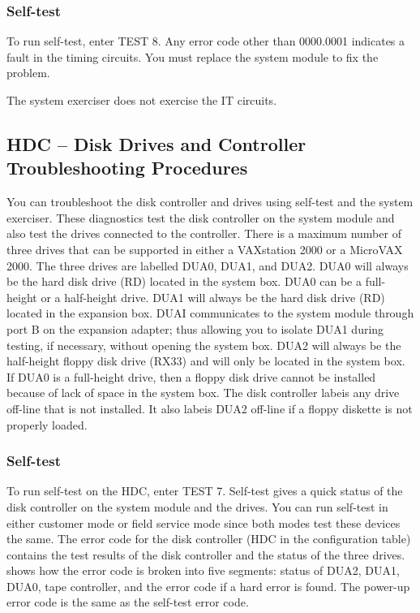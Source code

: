 \subsubsection{Self-test}

To run self-test, enter TEST 8. Any error code other than 0000.0001 indicates
a fault in the timing circuits. You must replace the system module to fix the
problem.

The system exerciser does not exercise the IT circuits.

\subsection{HDC -- Disk Drives and Controller Troubleshooting Procedures}


You can troubleshoot the disk controller and drives using self-test and the
system exerciser. These diagnostics test the disk controller on the system
module and also test the drives connected to the controller. There is a maximum 
number of three drives that can be supported in either a VAXstation
2000 or a MicroVAX 2000. The three drives are labelled DUA0, DUA1, and
DUA2. DUA0 will always be the hard disk drive (RD) located in the system
box. DUA0 can be a full-height or a half-height drive. DUA1 will always be
the hard disk drive (RD) located in the expansion box. DUAI communicates
to the system module through port B on the expansion adapter; thus allowing 
you to isolate DUA1 during testing, if necessary, without opening the
system box. DUA2 will always be the half-height floppy disk drive (RX33)
and will only be located in the system box. If DUA0 is a full-height drive,
then a floppy disk drive cannot be installed because of lack of space in the
system box. The disk controller labeis any drive off-line that is not installed.
It also labeis DUA2 off-line if a floppy diskette is not properly loaded.

\subsubsection{Self-test}

To run self-test on the HDC, enter TEST 7. Self-test gives a quick status
of the disk controller on the system module and the drives. You can run
self-test in either customer mode or field service mode since both modes
test these devices the same. The error code for the disk controller (HDC in
the configuration table) contains the test results of the disk controller and
the status of the three drives.  shows how the error code is
broken into five segments: status of DUA2, DUA1, DUA0, tape controller,
and the error code if a hard error is found. The power-up error code is the
same as the self-test error code.

